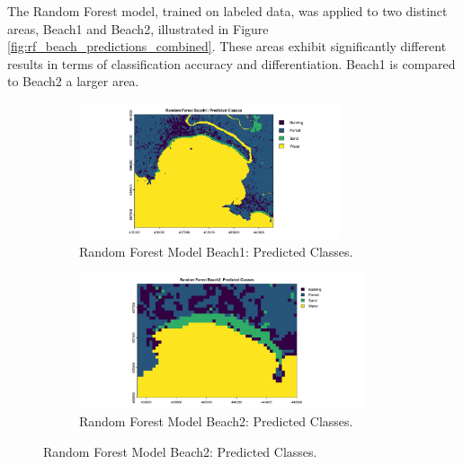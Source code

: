 \documentclass[a4paper,12pt]{article}
\begin{document}
The Random Forest model, trained on labeled data, was applied to two distinct areas, Beach1 and Beach2, illustrated in Figure \ref{fig:rf_beach_predictions_combined}. These areas exhibit significantly different results in terms of classification accuracy and differentiation. Beach1 is compared to Beach2 a larger area. 
\begin{figure} [H]
    \centering
    \begin{subfigure}[b]{0.45\linewidth}
        \centering
        \includegraphics[width=\linewidth, height=4cm]{Random_Forest_Model/Random Forest Beach1: Predicted Classes.png}
        \caption{Random Forest Model Beach1: Predicted Classes.}
        \label{fig:rf_beach1_classes}
    \end{subfigure}
    \hfill
    \begin{subfigure}[b]{0.45\linewidth}
        \centering
        \includegraphics[width=\linewidth, height=4cm]{Random_Forest_Model/Random Forest Beach2: predicted Classes.png}
        \caption{Random Forest Model Beach2: Predicted Classes.}
        \label{fig:rf_beach2_classes}
    \end{subfigure}
    
    \vspace{1em} %


\end{figure}
\end{document}

